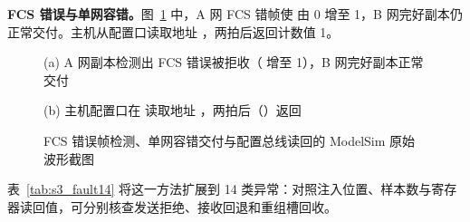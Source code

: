 \textbf{FCS 错误与单网容错。}图~\ref{fig:s3_cap_fcs} 中，A 网 FCS 错帧使  由 0 增至 1，B 网完好副本仍正常交付。主机从配置口读取地址 ，两拍后返回计数值 1。

\begin{figure}[H]\centering
{}\par\vspace{2pt}
{\footnotesize (a) A 网副本检测出 FCS 错误被拒收（ 增至 1），B 网完好副本正常交付\par}\vspace{4pt}
\par\vspace{2pt}
{\footnotesize (b) 主机配置口在  读取地址 ，两拍后（）返回 \par}
\caption{FCS 错误帧检测、单网容错交付与配置总线读回的 ModelSim 原始波形截图}\label{fig:s3_cap_fcs}
\end{figure}

表~\ref{tab:s3_fault14} 将这一方法扩展到 14 类异常：对照注入位置、样本数与寄存器读回值，可分别核查发送拒绝、接收回退和重组槽回收。

